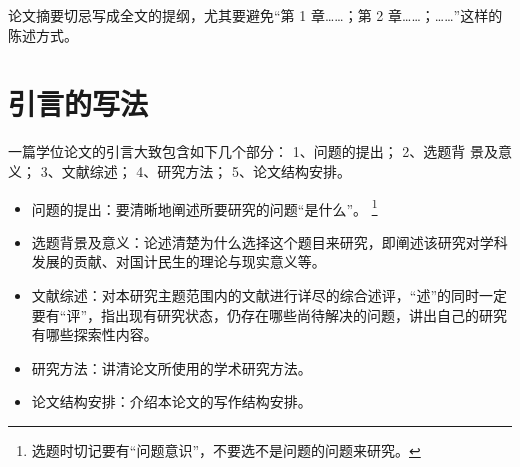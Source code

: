论文摘要切忌写成全文的提纲，尤其要避免“第 1 章……；第 2 章……；……”这样的陈述方式。



\section{引言的写法}

一篇学位论文的引言大致包含如下几个部分：
1、问题的提出；
2、选题背 景及意义；
3、文献综述；
4、研究方法；
5、论文结构安排。
\begin{itemize}
  \item 问题的提出：要清晰地阐述所要研究的问题“是什么”。
    \footnote{选题时切记要有“问题意识”，不要选不是问题的问题来研究。}
  \item 选题背景及意义：论述清楚为什么选择这个题目来研究，即阐述该研究对学科发展的贡献、对国计民生的理论与现实意义等。
  \item 文献综述：对本研究主题范围内的文献进行详尽的综合述评，“述”的同时一定要有“评”，指出现有研究状态，仍存在哪些尚待解决的问题，讲出自己的研究有哪些探索性内容。
  \item 研究方法：讲清论文所使用的学术研究方法。
  \item 论文结构安排：介绍本论文的写作结构安排。
\end{itemize}

